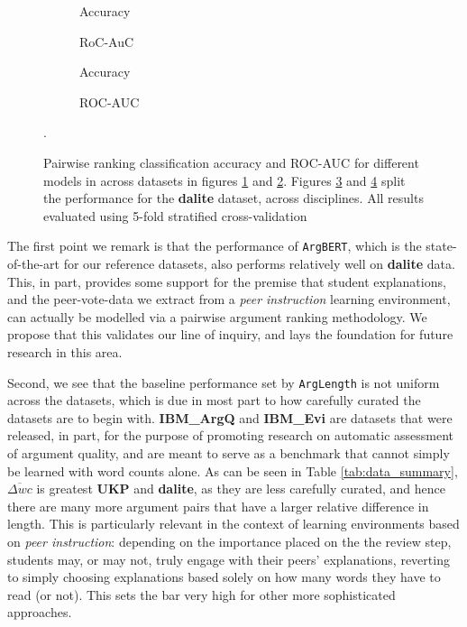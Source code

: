 \documentclass[runningheads]{llncs}
\begin{document}
\begin{figure}
	\begin{subfigure}[t]{0.5\linewidth}
		\centering
		\scalebox{0.5}{}
		\caption{Accuracy}
		\label{fig:acc_kfold}
	\end{subfigure}%
	\qquad
	\begin{subfigure}[t]{0.5\linewidth}
		\centering
		\scalebox{0.5}{}
		\caption{RoC-AuC}
		\label{fig:AUC_kfold}
	\end{subfigure}
	
	\begin{subfigure}[t]{0.5\linewidth}
		\centering
		\scalebox{0.5}{}
		\caption{Accuracy}
		\label{fig:acc_dalite_kfold}
	\end{subfigure}%
	\qquad
	\begin{subfigure}[t]{0.5\linewidth}
		\centering
		\scalebox{0.5}{}
		\caption{ROC-AUC}
		\label{fig:AUC_dalite_kfold}
	\end{subfigure}	
	\caption{Pairwise ranking classification accuracy and ROC-AUC for 
		different models in across datasets in figures \ref{fig:acc_kfold} and 
		\ref{fig:AUC_kfold}. Figures \ref{fig:acc_dalite_kfold} and 
		\ref{fig:AUC_dalite_kfold} split the performance for the 
		\textbf{dalite} 
		dataset, across disciplines. All results evaluated using 5-fold 
		stratified 
		cross-validation}.
	\label{fig:performance_k_fold}
\end{figure}

The first point we remark is that the performance of \verb|ArgBERT|, which is 
the state-of-the-art for our reference datasets, also performs relatively well 
on \textbf{dalite} data.
This, in part, provides some support for the premise that student explanations, 
and the peer-vote-data we extract from a \textit{peer instruction} learning 
environment, can actually be modelled via a pairwise argument ranking 
methodology.
We propose that this validates our line of inquiry, and lays the foundation 
for future research in this area.

Second, we see that the baseline performance set by \verb|ArgLength| is 
not uniform across the datasets, which is due in most part to how carefully 
curated the datasets are to begin with.
\textbf{IBM\_ArgQ} and \textbf{IBM\_Evi} are datasets that were released, in 
part, for the purpose of promoting research on automatic assessment of argument 
quality, and are meant to serve as a benchmark that cannot simply be learned 
with word counts alone.   
As can be seen in Table \ref{tab:data_summary}, $\overline{\Delta wc}$ is 
greatest \textbf{UKP} and \textbf{dalite}, as they are less carefully curated, 
and hence there are many more argument pairs that have a larger relative 
difference in length. 
This is particularly relevant in the context of learning environments based 
on \textit{peer instruction}: depending on the importance placed on the the 
review step, students may, or may not, truly engage with their peers' 
explanations, reverting to simply choosing explanations based solely on how 
many words they have to read (or not). 
This sets the bar very high for other more sophisticated approaches.
\end{document}
